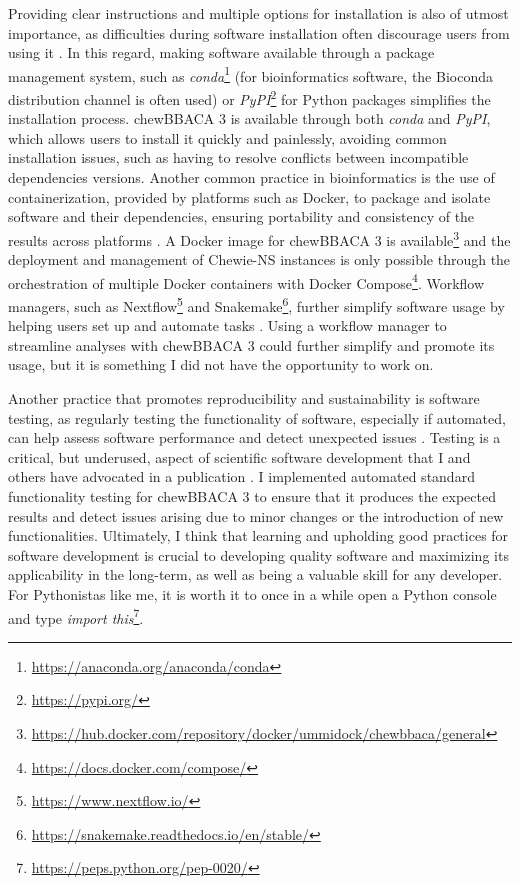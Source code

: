 Providing clear instructions and multiple options for installation is also of utmost importance, as difficulties during software installation often discourage users from using it \cite{alser_packaging_2024}. In this regard, making software available through a package management system, such as \textit{conda}\footnote{\url{https://anaconda.org/anaconda/conda}} (for bioinformatics software, the Bioconda distribution channel \cite{gruning_bioconda_2018} is often used) or \textit{PyPI}\footnote{\url{https://pypi.org/}} for Python packages simplifies the installation process. chewBBACA 3 is available through both \textit{conda} and \textit{PyPI}, which allows users to install it quickly and painlessly, avoiding common installation issues, such as having to resolve conflicts between incompatible dependencies versions. Another common practice in bioinformatics is the use of containerization, provided by platforms such as Docker, to package and isolate software and their dependencies, ensuring portability and consistency of the results across platforms \cite{gruening_recommendations_2018, nust_ten_2020, boettiger_introduction_2015, kadri_containers_2022}. A Docker image for chewBBACA 3 is available\footnote{\url{https://hub.docker.com/repository/docker/ummidock/chewbbaca/general}} and the deployment and management of Chewie-NS instances is only possible through the orchestration of multiple Docker containers with Docker Compose\footnote{\url{https://docs.docker.com/compose/}}. Workflow managers, such as Nextflow\footnote{\url{https://www.nextflow.io/}} and Snakemake\footnote{\url{https://snakemake.readthedocs.io/en/stable/}}, further simplify software usage by helping users set up and automate tasks \cite{wratten_reproducible_2021, strozzi_scalable_2019}. Using a workflow manager to streamline analyses with chewBBACA 3 could further simplify and promote its usage, but it is something I did not have the opportunity to work on.

Another practice that promotes reproducibility and sustainability is software testing, as regularly testing the functionality of software, especially if automated, can help assess software performance and detect unexpected issues \cite{krafczyk_scientific_2019}. Testing is a critical, but underused, aspect of scientific software development that I and others have advocated in a publication \cite{van_der_putten_software_2022}. I implemented automated standard functionality testing for chewBBACA 3 to ensure that it produces the expected results and detect issues arising due to minor changes or the introduction of new functionalities. Ultimately, I think that learning and upholding good practices for software development is crucial to developing quality software and maximizing its applicability in the long-term, as well as being a valuable skill for any developer. For Pythonistas like me, it is worth it to once in a while open a Python console and type \textit{import this}\footnote{\url{https://peps.python.org/pep-0020/}}.

